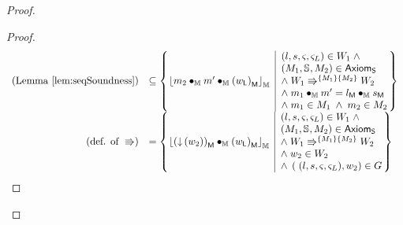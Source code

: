\begin{lemma}
\begin{proof}
\begin{proof}
\[\begin{array}{r l}
	
	\left(\text{Lemma } \ref{lem:seqSoundness} \right)
	& \subseteq
	\left\{
	\hspace*{-0.15cm}
	\begin{array}{l | l}
		\reifyH{\h{2} \composeH \h{}' \composeH \heapPart{\left(\localPart{w}\right)}}
		&
		\hspace*{-0.15cm}
		\begin{array}{l}
			(l, s, \amod{}, \amod{L}) \in W_1 \;\land\\ 
			(\Hp{1}, \seq{}, \Hp{2}) \in \AxiomsSeq \\
			\land\;\repartitions{W_1}{W_2}{\Hp{1}}{\Hp{2}}\\
			\land\; \h{1} \composeH \h{}' = \heapPart{l} \composeH \heapPart{s}\\
			\land\; \h{1} \in \Hp{1} \;\land\; \h{2} \in \Hp{2}
		\end{array}			
		\hspace*{-0.15cm}
	\end{array}
	\hspace*{-0.15cm}
	\right\}\\
	
	
	
	\left(\text{def. of } \Rrightarrow \right)
	& =
	\left\{
	\hspace*{-0.15cm}
	\begin{array}{l | l}
		\reifyH{ \heapPart{\left(\collapseW{w_2}\right)}  \composeH \heapPart{\left(\localPart{w}\right)}}
		&
		\hspace*{-0.15cm}
		\begin{array}{l}
			(l, s, \amod{}, \amod{L}) \in W_1 \;\land\\ 
			(\Hp{1}, \seq{}, \Hp{2}) \in \AxiomsSeq \\
			\land\;\repartitions{W_1}{W_2}{\Hp{1}}{\Hp{2}}\\
			\land\; w_2 \in W_2\\
			\land\; \left(\;(l, s, \amod{}, \amod{L}), w_2 \right) \in \guarantee
		\end{array}			
		\hspace*{-0.15cm}
	\end{array}
	\hspace*{-0.15cm}
	\right\}\\
	
	
	

\end{array}\]
\end{proof}
\end{proof}
\end{lemma}
